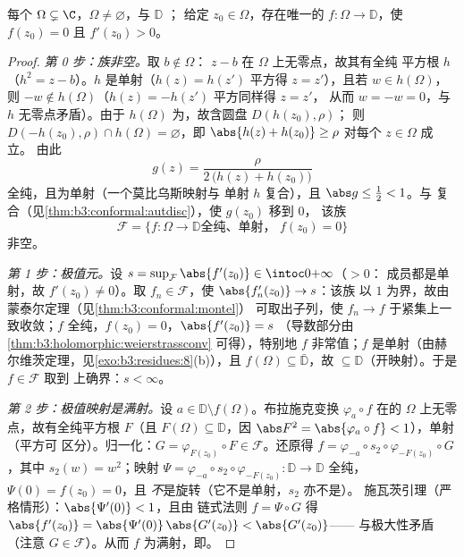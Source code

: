 \begin{theorem}[黎曼映射定理]
\label{thm:b3:conformal:rmt}
每个 $\Omega \subsetneq \C$，$\Omega
\neq \varnothing$，与 $\mathbb D$ ；
给定 $z_0 \in \Omega$，存在唯一的 $f \colon
\Omega \to \mathbb D$，使 $f(z_0) = 0$ 且 $f'(z_0) >
0$。
\end{theorem}

\begin{proof}
\emph{第 0 步：族非空。}取 $b \notin \Omega$：
$z - b$ 在 $\Omega$ 上无零点，故其有全纯
平方根 $h$（$h^2 = z - b$）。$h$ 是单射（$h(z) =
h(z')$ 平方得 $z = z'$），且若 $w \in h(\Omega)$，则 $-w
\notin h(\Omega)$（$h(z) = -h(z')$ 平方同样得 $z = z'$，
从而 $w = -w = 0$，与 $h$ 无零点矛盾）。由于
$h(\Omega)$ 为，故含圆盘 $D(h(z_0), \rho)$；
则 $D(-h(z_0), \rho) \cap h(\Omega) = \varnothing$，即
$\abs{h(z) + h(z_0)} \geq \rho$ 对每个 $z \in \Omega$ 成立。
由此
\[
g(z) = \frac{\rho}{2\,\bigl(h(z) + h(z_0)\bigr)}
\]
全纯，且为单射（一个莫比乌斯映射与
单射 $h$ 复合），且 $\abs g \leq \frac12 < 1$。与
复合（见\cref{thm:b3:conformal:autdisc}），使 $g(z_0)$ 移到 $0$，
该族
\[
\mathcal F = \{f \colon \Omega \to \mathbb D \text{
全纯、单射， } f(z_0) = 0\}
\]
非空。

\emph{第 1 步：极值元。}设 $s =
\sup_{\mathcal F}\abs{f'(z_0)} \in \intoc0{+\infty}$（$> 0$：
成员都是单射，故 $f'(z_0) \neq 0$）。取 $f_n \in
\mathcal F$，使 $\abs{f_n'(z_0)} \to s$：该族
以 $1$ 为界，故由蒙泰尔定理（见\cref{thm:b3:conformal:montel}）
可取出子列，使 $f_n \to f$ 于紧集上一致收敛；$f$
全纯，$f(z_0) = 0$，$\abs{f'(z_0)} = s$
（导数部分由\cref{thm:b3:holomorphic:weierstrassconv}
可得），特别地 $f$ 非常值；$f$
是单射（由赫尔维茨定理，见\cref{exo:b3:residues:8}(b)），且
$f(\Omega) \subseteq \bar{\mathbb D}$，故 $\subseteq
\mathbb D$（开映射）。于是 $f \in \mathcal F$ 取到
上确界：$s < \infty$。

\emph{第 2 步：极值映射是满射。}设 $a \in
\mathbb D\setminus f(\Omega)$。布拉施克变换
$\varphi_a\circ f$ 在的
$\Omega$ 上无零点，故有全纯平方根 $F$（且
$F(\Omega) \subseteq \mathbb D$，因 $\abs F^2 =
\abs{\varphi_a\circ f} < 1$），单射（平方可
区分）。归一化：$G = \varphi_{F(z_0)}\circ F \in
\mathcal F$。还原得 $f = \varphi_{-a}\circ s_2 \circ
\varphi_{-F(z_0)}\circ G$，其中 $s_2(w) = w^2$；映射 $\Psi
= \varphi_{-a}\circ s_2\circ\varphi_{-F(z_0)} \colon \mathbb D
\to \mathbb D$ 全纯，$\Psi(0) = f(z_0) = 0$，且
\emph{不}是旋转（它不是单射，$s_2$ 亦不是）。
施瓦茨引理（严格情形）：$\abs{\Psi'(0)} < 1$，且由
链式法则 $f = \Psi\circ G$ 得 $\abs{f'(z_0)} =
\abs{\Psi'(0)}\,\abs{G'(z_0)} < \abs{G'(z_0)}$——
与极大性矛盾（注意 $G \in \mathcal F$）。从而 $f$
为满射，即。


\end{proof}
